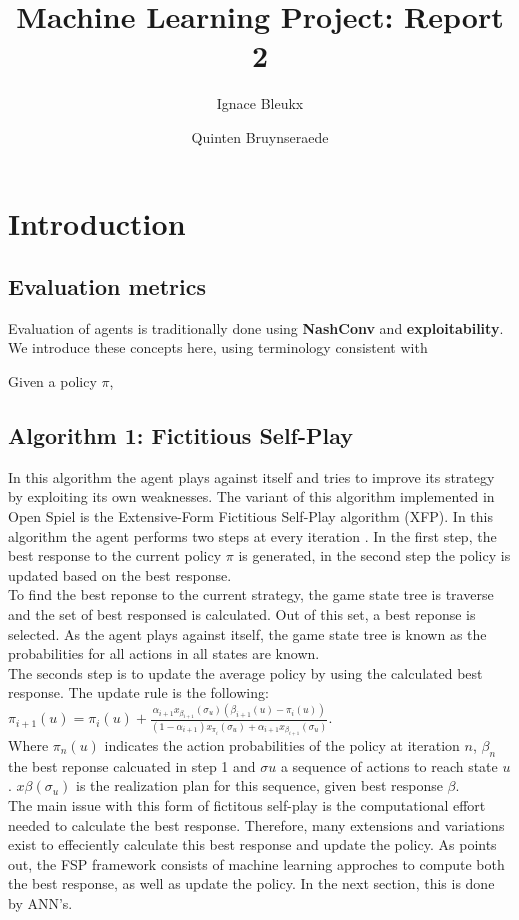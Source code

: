 \documentclass[10pt,a4paper]{article}
\title{Machine Learning Project: Report 2}
\author{Ignace Bleukx \and Quinten Bruynseraede}
\begin{document}
\maketitle
\section{Introduction}
\subsection{Evaluation metrics}
Evaluation of agents is traditionally done using \textbf{NashConv} and \textbf{exploitability}. We introduce these concepts here, using terminology consistent with 

Given a policy $\pi$,
\subsection{Algorithm 1: Fictitious Self-Play}
In this algorithm the agent plays against itself and tries to improve its strategy by exploiting its own weaknesses. The variant of this algorithm implemented in Open Spiel is the Extensive-Form Fictitious Self-Play algorithm (XFP). In this algorithm the agent performs two steps at every iteration \citep{fsp-ext}. In the first step, the best response to the current policy $\pi$ is generated, in the second step the policy is updated based on the best response.\\
To find the best reponse to the current strategy, the game state tree is traverse and the set of best responsed is calculated. Out of this set, a best reponse is selected. As the agent plays against itself, the game state tree is known as the probabilities for all actions in all states are known.\\
The seconds step is to update the average policy by using the calculated best response. The update rule is the following:
\begin{math}
\pi_{i+1}(u) = \pi_{i}(u) + \frac{\alpha_{i+1}x_{\beta_{i+1}}(\sigma_{u})(\beta_{i+1}(u) - \pi_i(u))}{(1-\alpha_{i+1})x_{\pi_i}(\sigma_{u}) + \alpha_{i+1}x_{\beta_{i+1}}(\sigma_u)}
\end{math}.\\
Where $\pi_n(u)$ indicates the action probabilities of the policy at iteration $n$, $\beta_n$ the best reponse calcuated in step 1 and $\sigma{u}$ a sequence of actions to reach state $u$. $x{\beta}(\sigma_u)$ is the realization plan for this sequence, given best response $\beta$.\\
The main issue with this form of fictitous self-play is the computational effort needed to calculate the best response. Therefore, many extensions and variations exist to effeciently calculate this best response and update the policy. As \cite{fsp-ext} points out, the FSP framework consists of machine learning approches to compute both the best response, as well as update the policy. 
In the next section, this is done by ANN's.
\end{document}
